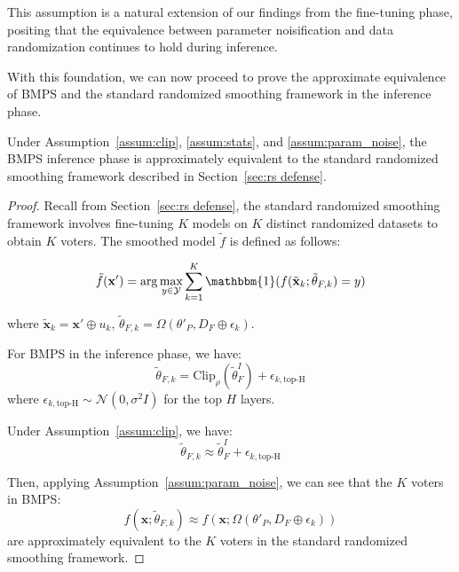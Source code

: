 This assumption is a natural extension of our findings from the fine-tuning phase, positing that the equivalence between parameter noisification and data randomization continues to hold during inference.

With this foundation, we can now proceed to prove the approximate equivalence of BMPS and the standard randomized smoothing framework in the inference phase.

\begin{theorem}
Under Assumption~\ref{assum:clip}, \ref{assum:stats}, and \ref{assum:param_noise}, the BMPS inference phase is approximately equivalent to the standard randomized smoothing framework described in Section~\ref{sec:rs defense}.
\end{theorem}

\begin{proof}
Recall from Section~\ref{sec:rs defense}, the standard randomized smoothing framework involves fine-tuning $K$ models on $K$ distinct randomized datasets to obtain $K$ voters. The smoothed model $\tilde{f}$ is defined as follows:

\begin{equation}
    \tilde{f}(\mathbf{x}') = \arg\max_{y \in \mathcal{Y}} \sum_{k=1}^K \mathbbm{1}(f(\tilde{\mathbf{x}}_k; \tilde{\theta}_{F,k}) = y)
\end{equation}

where $\tilde{\mathbf{x}}_k = \mathbf{x}' \oplus u_k$, $\tilde{\theta}_{F,k} = \Omega(\theta'_P, D_F \oplus \epsilon_k)$.

For BMPS in the inference phase, we have:
\begin{equation}
    \tilde{\theta}_{F,k} = \text{Clip}_\rho(\tilde{\theta}^I_F) + \epsilon_{k,\text{top-H}}
\end{equation}
where $\epsilon_{k,\text{top-H}} \sim \mathcal{N}(0, \sigma^2I)$ for the top $H$ layers.

Under Assumption~\ref{assum:clip}, we have:
\begin{equation}
    \tilde{\theta}_{F,k} \approx \tilde{\theta}^I_F + \epsilon_{k,\text{top-H}}
\end{equation}

Then, applying Assumption~\ref{assum:param_noise}, we can see that the $K$ voters in BMPS:
\begin{equation}
    f(\mathbf{x}; \tilde{\theta}_{F,k}) \approx f(\mathbf{x}; \Omega(\theta'_P, D_F \oplus \epsilon_k))
\end{equation}
are approximately equivalent to the $K$ voters in the standard randomized smoothing framework.


\end{proof}
